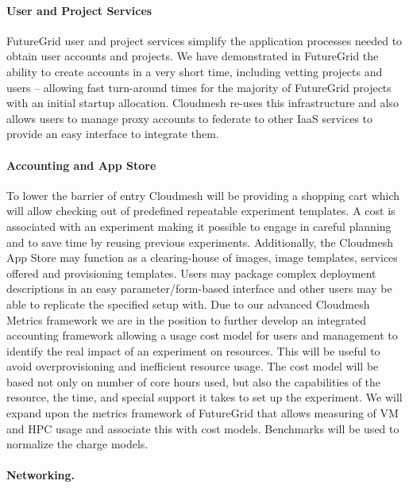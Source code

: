 \documentclass{article}
\begin{document}
\paragraph{User and Project Services}


FutureGrid user and project services simplify the application processes needed to obtain user accounts and projects. We have demonstrated in FutureGrid the ability to create accounts in a very short time, including vetting projects and users – allowing fast turn-around times for the majority of FutureGrid projects with an initial startup allocation. Cloudmesh re-uses this infrastructure and also allows users to manage proxy accounts to federate to other IaaS services to provide an easy interface to integrate them.


\paragraph{Accounting and App Store}


To lower the barrier of entry Cloudmesh will be providing a shopping cart which will allow checking out of predefined repeatable experiment templates. A cost is associated with an experiment making it possible to engage in careful planning and to save time by reusing previous experiments. Additionally, the Cloudmesh App Store may function as a clearing-house of images, image templates, services offered and provisioning templates. Users may package complex deployment descriptions in an easy parameter/form-based interface and other users may be able to replicate the specified setup with.
Due to our advanced Cloudmesh Metrics framework we are in the position to further develop an integrated accounting framework allowing a usage cost model for users and management to identify the real impact of an experiment on resources. This will be useful to avoid overprovisioning and inefficient resource usage. The cost model will be based not only on number of core hours used, but also the capabilities of the resource, the time, and special support it takes to set up the experiment. We will expand upon the metrics framework of FutureGrid that allows measuring of VM and HPC usage and associate this with cost models. Benchmarks will be used to normalize the charge models.


\paragraph{Networking.}
\end{document}
